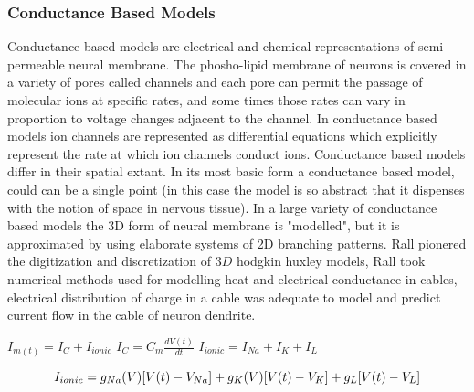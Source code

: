 \subsubsection{Conductance Based Models}
Conductance based models are electrical and chemical representations of semi-permeable neural membrane.  The phosho-lipid membrane of neurons is covered in a variety of pores called channels and each pore can permit the passage of molecular ions at specific rates, and some times those rates can vary in proportion to voltage changes adjacent to the channel. In conductance based models ion channels are represented as differential equations which explicitly represent the rate at which ion channels conduct ions. Conductance based models differ in their spatial extant. In its most basic form a conductance based model, could can be a single point (in this case the model is so abstract that it dispenses with the notion of space in nervous tissue). In a large variety of conductance based models the 3D form of neural membrane is "modelled", but it is approximated by using elaborate systems of 2D branching patterns. \cite{rall1962electrophysiology} Rall pionered the digitization and discretization of $3D$ hodgkin huxley models, Rall took numerical methods used for modelling heat and electrical conductance in cables, electrical distribution of charge in a cable was adequate to model and predict current flow in the cable of neuron dendrite.\\ %
\begin{center}

$ I_{m(t)}=I_{C}+I_{ionic} $
$I_{C}=C_{m}\frac{dV(t)}{dt} $
$I_{ionic}=I_{Na}+I_{K}+I_{L} $
\end{center}

\begin{equation}
I_{ionic}=\\
g_{Na}(V)[V(t)-V_{Na}]+\\
g_{K}(V)[V(t)-V_{K}]+\\g_{L}[V(t)-V_{L}] 
\end{equation}


